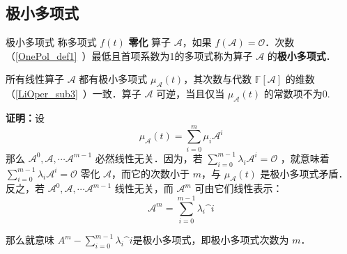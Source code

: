 \subsection{极小多项式}
\begin{definition}{极小多项式}
称多项式 $f(t)$ \textbf{零化} 算子 $\mathcal{A}$，如果 $f(\mathcal{A})=\mathcal O$．次数（\autoref{OnePol_def1}~）最低且首项系数为1的多项式称为算子 $\mathcal{A}$ 的\textbf{极小多项式}．
\end{definition}
\begin{theorem}{}
所有线性算子 $\mathcal{A}$ 都有极小多项式 $\mu_\mathcal{A}(t)$，其次数与代数 $\mathbb{F}[\mathcal{A}]$ 的维数（\autoref{LiOper_sub3}~）一致．算子 $\mathcal{A}$ 可逆，当且仅当 $\mu_\mathcal{A}(t)$ 的常数项不为0.
\end{theorem}
\textbf{证明：}设
\begin{equation}
\mu_\mathcal{A}(t)=\sum_{i=0}^m\mu_i\mathcal A^i
\end{equation}
那么 $\mathcal{A}^0,\mathcal{A},\cdots \mathcal{A}^{m-1}$ 必然线性无关．因为，若 $\sum_{i=0}^{m-1}\lambda_i\mathcal{A}^i=\mathcal{O}$ ，就意味着 $\sum_{i=0}^{m-1}\lambda_i\mathcal{A}^i=\mathcal{O}$ 零化 $\mathcal A$，而它的次数小于 $m$，与 $\mu_\mathcal{A}(t)$ 是极小多项式矛盾．反之，若 $\mathcal{A}^0,\mathcal{A},\cdots \mathcal{A}^{m-1}$ 线性无关，而 $\mathcal{A}^m$ 可由它们线性表示：
\begin{equation}
\mathcal A^m=\sum_{i=0}^{m-1}\lambda_i\mathcal^i
\end{equation}

那么就意味 $A^m-\sum_{i=0}^{m-1}\lambda_i\mathcal^i$是极小多项式，即极小多项式次数为 $m$．